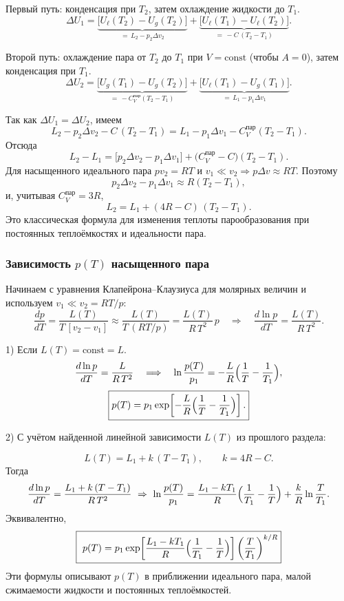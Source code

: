 \documentclass[12pt, a4paper]{article}%
\begin{document}
Первый путь: конденсация при \(T_2\), затем охлаждение жидкости до \(T_1\).
\[
\Delta U_1 = \underbrace{\bigl[U_{\ell}(T_2)-U_{g}(T_2)\bigr]}_{=\,L_2-p_2\Delta v_2}
+\underbrace{\bigl[U_{\ell}(T_1)-U_{\ell}(T_2)\bigr]}_{=\, - C\,(T_2-T_1)}.
\]

Второй путь: охлаждение пара от \(T_2\) до \(T_1\) при \(V=\text{const}\) (чтобы \(A=0\)), затем конденсация при \(T_1\).
\[
\Delta U_2 = \underbrace{\bigl[U_{g}(T_1)-U_{g}(T_2)\bigr]}_{=\, - C_V^{\text{пар}}(T_2-T_1)}
+\underbrace{\bigl[U_{\ell}(T_1)-U_{g}(T_1)\bigr]}_{=\, L_1-p_1\Delta v_1}.
\]

Так как \(\Delta U_1=\Delta U_2\), имеем
\[
L_2-p_2\Delta v_2 - C\,(T_2-T_1)=L_1-p_1\Delta v_1 - C_V^{\text{пар}}(T_2-T_1).
\]
Отсюда
\[
L_2-L_1=\bigl[p_2\Delta v_2 - p_1\Delta v_1\bigr]+\bigl(C_V^{\text{пар}}-C\bigr)(T_2-T_1).
\]
Для насыщенного идеального пара \(pv_2=RT\) и \(v_1\ll v_2\Rightarrow p\Delta v\approx RT\). Поэтому
\[
p_2\Delta v_2 - p_1\Delta v_1 \approx R(T_2-T_1),
\]
и, учитывая \(C_V^{\text{пар}}=3R\),
\[
\boxed{ L_2 = L_1 + (4R - C)\,(T_2-T_1). }
\]
Это классическая формула для изменения теплоты парообразования при постоянных теплоёмкостях и идеальности пара.

\subsubsection*{Зависимость \(p(T)\) насыщенного пара}
Начинаем с уравнения Клапейрона–Клаузиуса для молярных величин и используем \(v_1\ll v_2=RT/p\):
\[
\frac{dp}{dT}=\frac{L(T)}{T\,[v_2-v_1]}\approx \frac{L(T)}{T\,(RT/p)}=\frac{L(T)}{R\,T^2}\,p
\quad\Longrightarrow\quad
\frac{d\ln p}{dT}=\frac{L(T)}{R\,T^2}.
\]

1) Если \(L(T)= \text{const} =L\).
\[
\frac{d\ln p}{dT}=\frac{L}{R\,T^2}
\quad \Longrightarrow\quad 
\ln\frac{p(T)}{p_1}= -\frac{L}{R}\Bigl(\frac{1}{T}-\frac{1}{T_1}\Bigr),
\]
\[
\boxed{ p(T)=p_1\exp\!\left[-\frac{L}{R}\Bigl(\frac{1}{T}-\frac{1}{T_1}\Bigr)\right]. }
\]

2) С учётом найденной линейной зависимости \(L(T)\) из прошлого раздела:

\[
L(T)=L_1 + k\,(T-T_1), \qquad k=4R - C.
\]
Тогда
\[
\frac{d\ln p}{dT}=\frac{L_1 + k\,(T-T_1)}{R\,T^2}
\ \Rightarrow\ 
\ln\frac{p(T)}{p_1}
= \frac{L_1 - k T_1}{R}\Bigl(\frac{1}{T_1}-\frac{1}{T}\Bigr) + \frac{k}{R}\ln\frac{T}{T_1}.
\]
Эквивалентно,
\[
\boxed{\ p(T)=p_1
\exp\!\left[\frac{L_1 - k T_1}{R}\Bigl(\frac{1}{T_1}-\frac{1}{T}\Bigr)\right]
\left(\frac{T}{T_1}\right)^{k/R} }
\]
Эти формулы описывают \(p(T)\) в приближении идеального пара, малой сжимаемости жидкости и постоянных теплоёмкостей.
\end{document}
